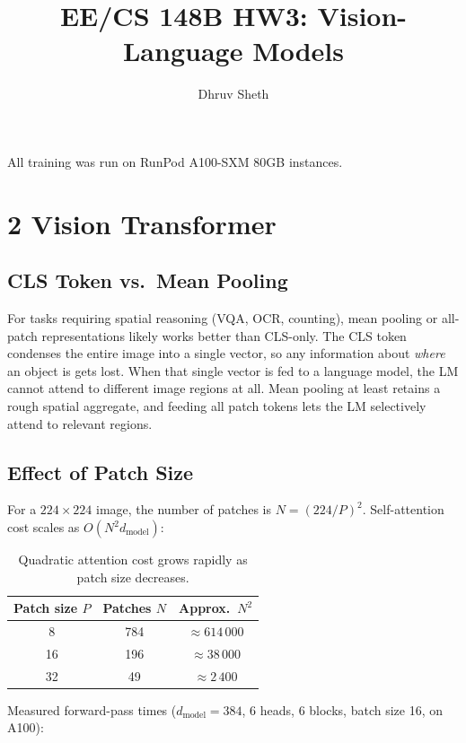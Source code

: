 \documentclass[11pt]{article}
\title{EE/CS 148B HW3: Vision-Language Models}
\author{Dhruv Sheth}
\date{}
\begin{document}
\maketitle

All training was run on RunPod A100-SXM 80GB instances.

\section*{2 Vision Transformer}

\subsection*{CLS Token vs.\ Mean Pooling}

For tasks requiring spatial reasoning (VQA, OCR, counting), mean pooling or
all-patch representations likely works better than CLS-only. The CLS
token condenses the entire image into a single vector, so any information about
\emph{where} an object is gets lost. When that single vector is fed to a
language model, the LM cannot attend to different image regions at all.
Mean pooling at least retains a rough spatial aggregate, and feeding all patch
tokens lets the LM selectively attend to relevant regions.

\subsection*{Effect of Patch Size}

For a $224 \times 224$ image, the number of patches is $N = (224/P)^2$.
Self-attention cost scales as $O(N^2 d_{\text{model}})$:

\begin{table}[H]
\centering
\begin{tabular}{ccc}
\toprule
Patch size $P$ & Patches $N$ & Approx.\ $N^2$ \\
\midrule
8  & 784 & $\approx 614\,000$ \\
16 & 196 & $\approx 38\,000$  \\
32 & 49  & $\approx 2\,400$   \\
\bottomrule
\end{tabular}
\caption{Quadratic attention cost grows rapidly as patch size decreases.}
\end{table}

Measured forward-pass times ($d_{\text{model}}=384$, 6 heads, 6 blocks,
batch size 16, on A100):
\end{document}
